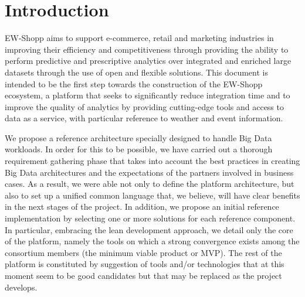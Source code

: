 \section{Introduction}

EW-Shopp aims to support e-commerce, retail and marketing industries in improving their efficiency and competitiveness through providing the ability to perform predictive and prescriptive analytics over integrated and enriched large datasets through the use of open and flexible solutions. 
This document is intended to be the first step towards the construction of the EW-Shopp ecosystem, a platform that seeks to significantly reduce integration time and to improve the quality of analytics by providing cutting-edge tools and access to data as a service, with particular reference to weather and event information.  

We propose a reference architecture specially designed to handle Big Data workloads. 
In order for this to be possible, we have carried out a thorough requirement gathering phase that takes into account the best practices in creating Big Data architectures and the expectations of the partners involved in business cases. As a result, we were able not only to define the platform architecture, but also to set up a unified common language that, we believe, will have clear benefits in the next stages of the project.
In addition, we propose an initial reference implementation by selecting one or more solutions for each reference component. In particular, embracing the lean development approach, we detail only the core of the platform, namely the tools on which a strong convergence exists among the consortium members (the minimum viable product or MVP). The rest of the platform is constituted by suggestion of tools and/or technologies that at this moment seem to be good candidates but that may be replaced as the project develops. 

